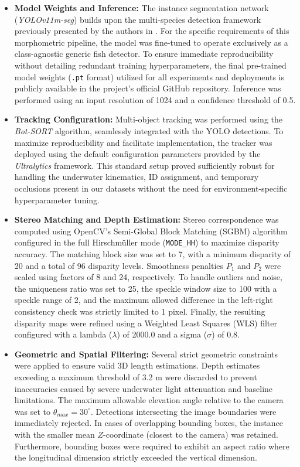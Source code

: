 \documentclass[utf8]{FrontiersinHarvard} %
\begin{document}
\begin{itemize}
    \item \textbf{Model Weights and Inference:}
    The instance segmentation network (\textit{YOLOv11m-seg}) builds upon the multi-species detection framework previously presented by the authors in \citep{muntaner2025automatic}. For the specific requirements of this morphometric pipeline, the model was fine-tuned to operate exclusively as a class-agnostic generic fish detector. To ensure immediate reproducibility without detailing redundant training hyperparameters, the final pre-trained model weights (\texttt{.pt} format) utilized for all experiments and deployments is publicly available in the project's official GitHub repository. Inference was performed using an input resolution of 1024 and a confidence threshold of 0.5.
    
    \item \textbf{Tracking Configuration:}
    Multi-object tracking was performed using the \textit{Bot-SORT} algorithm, seamlessly integrated with the YOLO detections. To maximize reproducibility and facilitate implementation, the tracker was deployed using the default configuration parameters provided by the \textit{Ultralytics} framework. This standard setup proved sufficiently robust for handling the underwater kinematics, ID assignment, and temporary occlusions present in our datasets without the need for environment-specific hyperparameter tuning.
    
    \item \textbf{Stereo Matching and Depth Estimation:}
    Stereo correspondence was computed using OpenCV's Semi-Global Block Matching (SGBM) algorithm configured in the full Hirschmüller mode (\texttt{MODE\_HH}) to maximize disparity accuracy. The matching block size was set to 7, with a minimum disparity of 20 and a total of 96 disparity levels. Smoothness penalties $P_1$ and $P_2$ were scaled using factors of 8 and 24, respectively. To handle outliers and noise, the uniqueness ratio was set to 25, the speckle window size to 100 with a speckle range of 2, and the maximum allowed difference in the left-right consistency check was strictly limited to 1 pixel. Finally, the resulting disparity maps were refined using a Weighted Least Squares (WLS) filter configured with a lambda ($\lambda$) of 2000.0 and a sigma ($\sigma$) of 0.8.
    
    
    \item \textbf{Geometric and Spatial Filtering:}
    Several strict geometric constraints were applied to ensure valid 3D length estimations. Depth estimates exceeding a maximum threshold of 3.2 m were discarded to prevent inaccuracies caused by severe underwater light attenuation and baseline limitations. The maximum allowable elevation angle relative to the camera was set to $\theta_{max} = 30^\circ$. Detections intersecting the image boundaries were immediately rejected. In cases of overlapping bounding boxes, the instance with the smaller mean $Z$-coordinate (closest to the camera) was retained. Furthermore, bounding boxes were required to exhibit an aspect ratio where the longitudinal dimension strictly exceeded the vertical dimension.
    

\end{itemize}
\end{document}
